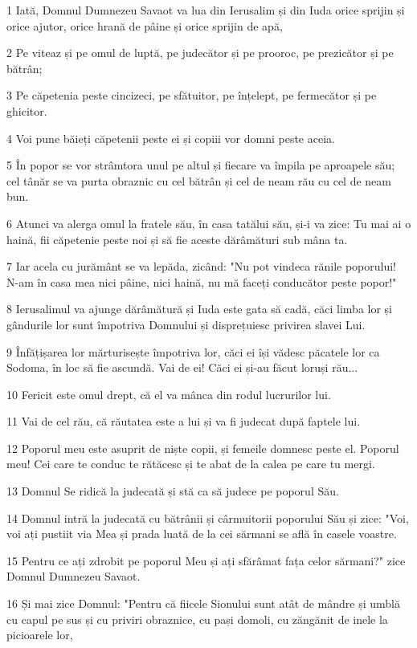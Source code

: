 \par 1 Iată, Domnul Dumnezeu Savaot va lua din Ierusalim și din Iuda orice sprijin și orice ajutor, orice hrană de pâine și orice sprijin de apă,
\par 2 Pe viteaz și pe omul de luptă, pe judecător și pe prooroc, pe prezicător și pe bătrân;
\par 3 Pe căpetenia peste cincizeci, pe sfătuitor, pe înțelept, pe fermecător și pe ghicitor.
\par 4 Voi pune băieți căpetenii peste ei și copiii vor domni peste aceia.
\par 5 În popor se vor strâmtora unul pe altul și fiecare va împila pe aproapele său; cel tânăr se va purta obraznic cu cel bătrân și cel de neam rău cu cel de neam bun.
\par 6 Atunci va alerga omul la fratele său, în casa tatălui său, și-i va zice: Tu mai ai o haină, fii căpetenie peste noi și să fie aceste dărâmături sub mâna ta.
\par 7 Iar acela cu jurământ se va lepăda, zicând: "Nu pot vindeca rănile poporului! N-am în casa mea nici pâine, nici haină, nu mă faceți conducător peste popor!"
\par 8 Ierusalimul va ajunge dărâmătură și Iuda este gata să cadă, căci limba lor și gândurile lor sunt împotriva Domnului și disprețuiesc privirea slavei Lui.
\par 9 Înfățișarea lor mărturisește împotriva lor, căci ei își vădesc păcatele lor ca Sodoma, în loc să fie ascundă. Vai de ei! Căci ei și-au făcut loruși rău...
\par 10 Fericit este omul drept, că el va mânca din rodul lucrurilor lui.
\par 11 Vai de cel rău, că răutatea este a lui și va fi judecat după faptele lui.
\par 12 Poporul meu este asuprit de niște copii, și femeile domnesc peste el. Poporul meu! Cei care te conduc te rătăcesc și te abat de la calea pe care tu mergi.
\par 13 Domnul Se ridică la judecată și stă ca să judece pe poporul Său.
\par 14 Domnul intră la judecată cu bătrânii și cârmuitorii poporului Său și zice: "Voi, voi ați pustiit via Mea și prada luată de la cei sărmani se află în casele voastre.
\par 15 Pentru ce ați zdrobit pe poporul Meu și ați sfărâmat fața celor sărmani?" zice Domnul Dumnezeu Savaot.
\par 16 Și mai zice Domnul: "Pentru că fiicele Sionului sunt atât de mândre și umblă cu capul pe sus și cu priviri obraznice, cu pași domoli, cu zăngănit de inele la picioarele lor,
